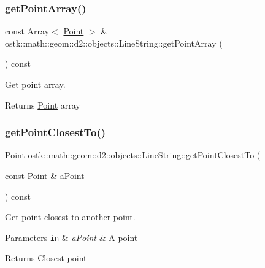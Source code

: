 \subsubsection{\texorpdfstring{get\+Point\+Array()}{getPointArray()}}
{\footnotesize\ttfamily const Array$<$ \hyperlink{classostk_1_1math_1_1geom_1_1d2_1_1objects_1_1_point}{Point} $>$ \& ostk\+::math\+::geom\+::d2\+::objects\+::\+Line\+String\+::get\+Point\+Array (\begin{DoxyParamCaption}{ }\end{DoxyParamCaption}) const}



Get point array. 

\begin{DoxyReturn}{Returns}
\hyperlink{classostk_1_1math_1_1geom_1_1d2_1_1objects_1_1_point}{Point} array 
\end{DoxyReturn}
\mbox{\label{classostk_1_1math_1_1geom_1_1d2_1_1objects_1_1_line_string_adba8e8498cade7e10b4df301b0215d8e}} 
\subsubsection{\texorpdfstring{get\+Point\+Closest\+To()}{getPointClosestTo()}}
{\footnotesize\ttfamily \hyperlink{classostk_1_1math_1_1geom_1_1d2_1_1objects_1_1_point}{Point} ostk\+::math\+::geom\+::d2\+::objects\+::\+Line\+String\+::get\+Point\+Closest\+To (\begin{DoxyParamCaption}\item[{const \hyperlink{classostk_1_1math_1_1geom_1_1d2_1_1objects_1_1_point}{Point} \&}]{a\+Point }\end{DoxyParamCaption}) const}



Get point closest to another point. 


\begin{DoxyParams}[1]{Parameters}
\mbox{\tt in}  & {\em a\+Point} & A point \\
\hline
\end{DoxyParams}
\begin{DoxyReturn}{Returns}
Closest point 
\end{DoxyReturn}
\mbox{\label{classostk_1_1math_1_1geom_1_1d2_1_1objects_1_1_line_string_af4a7c10fc43a4facff65280e23217ec4}} 
